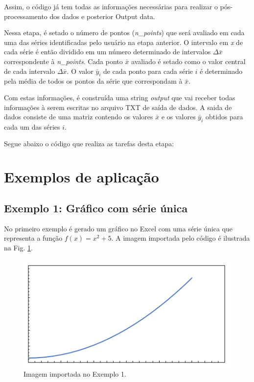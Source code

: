 \documentclass{article}
\begin{document}
    Assim, o código já tem todas as informações necessárias para realizar o pós-processamento dos dados e posterior Output data. 
    
    Nessa etapa, é setado o número de pontos (\textit{n\_points}) que será avaliado em cada uma das séries identificadas pelo usuário na etapa anterior. O intervalo em \textit{x} de cada série é então dividido em um número determinado de intervalos $\Delta \bar{x}$ correspondente à \textit{n\_points}. Cada ponto $\bar{x}$ avaliado é setado como o valor central de cada intervalo $\Delta \bar{x}$. O valor $\bar{y}_i$ de cada ponto para cada série $i$ é determinado pela média de todos os pontos da série que correspondam à $\bar{x}$. 
    
    Com estas informações, é construída uma string \textit{output} que vai receber todas informações à serem escritas no arquivo TXT de saída de dados. A saida de dados consiste de uma matriz contendo os valores $\bar{x}$ e os valores $\bar{y}_i$ obtidos para cada um das séries $i$.
    
    Segue abaixo o código que realiza as tarefas desta etapa:
     
      

    \section{Exemplos de aplicação}    
    \subsection{Exemplo 1: Gráfico com série única}    
    
    No primeiro exemplo é gerado um gráfico no Excel com uma série única que representa a função $f(x)=x^2+5$. A imagem importada pelo código é ilustrada na Fig. \ref{fig:ex1_1}. 
    
    \begin{figure}[h]
        \centering
        \includegraphics[scale=0.5]{t2.PNG}
        \caption{Imagem importada no Exemplo 1.}
        \label{fig:ex1_1}
    \end{figure}
    
\end{document}
